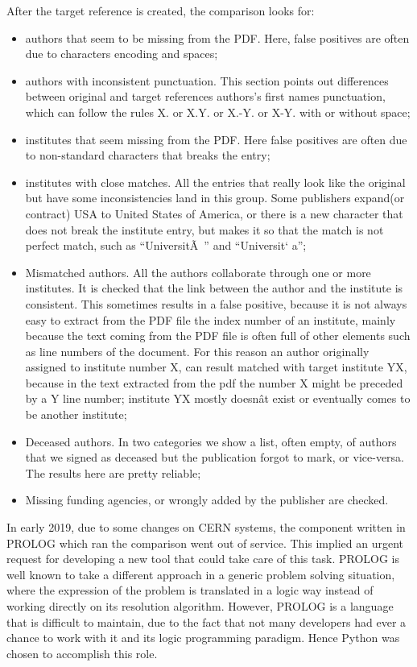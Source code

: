 After the target reference is created, the comparison looks for:
\begin{itemize}
\item authors that seem to be missing from the PDF. Here, false positives are often due to characters encoding and spaces;
\item authors with inconsistent punctuation. This section points out differences between original and target references authors's first names punctuation,
which can follow the rules X. or X.Y. or X.-Y. or X-Y. with or without space;
\item institutes that seem missing from the PDF. Here false positives are often due to non-standard characters that breaks the entry;
\item institutes with close matches. All the entries that really look like the original but have some inconsistencies land in this group.
  Some publishers expand(or contract) USA to United States of America,
  or there is a new character that does not break the institute entry,
  but makes it so that the match is not perfect match, such as \enquote{UniversitÃ } and \enquote{Universit` a};
\item Mismatched authors. All the authors collaborate through one or more institutes.
  It is checked that the link between the author and the institute is consistent.
  This sometimes results in a false positive,
  because it is not always easy to extract from the PDF file the index number of an institute,
  mainly because the text coming from the PDF file is often full of other elements such as line numbers of the document.
  For this reason an author originally assigned to institute number X, can result matched with target institute YX,
  because in the text extracted from the pdf the number X might be preceded by a Y line number;
  institute YX mostly doesnât exist or eventually comes to be another institute;
\item Deceased authors. In two categories we show a list, often empty, of authors that we signed as deceased but the publication forgot to mark, or vice-versa.
  The results here are pretty reliable;
\item Missing funding agencies, or wrongly added by the publisher are checked.
\end{itemize}

In early 2019, due to some changes on CERN systems, the component written in PROLOG which ran the comparison went out of service.
This implied an urgent request for developing a new tool that could take care of this task.
PROLOG is well known to take a different approach in a generic problem solving situation,
where the expression of the problem is translated in a logic way instead of working directly on its resolution algorithm.
However, PROLOG is a language that is difficult to maintain,
due to the fact that not many developers had ever a chance to work with it and its logic programming paradigm.
Hence Python was chosen to accomplish this role.

